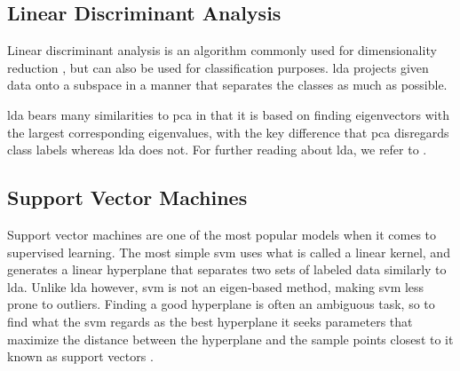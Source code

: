 


\subsection{Linear Discriminant Analysis}

Linear discriminant analysis is an algorithm commonly used for dimensionality reduction \citep{raschka_2014}, but can also be used for classification purposes. \gls{lda} projects given data onto a subspace in a manner that separates the classes as much as possible. 

\gls{lda} bears many similarities to \gls{pca} in that it is based on finding eigenvectors with the largest corresponding eigenvalues, with the key difference that \gls{pca} disregards class labels whereas \gls{lda} does not. For further reading about \gls{lda}, we refer to \citep{raschka_2014}.



\subsection{Support Vector Machines}
Support vector machines are one of the most popular models when it comes to supervised learning. The most simple \gls{svm} uses what is called a linear kernel, and generates a linear hyperplane that separates two sets of labeled data similarly to \gls{lda}. Unlike \gls{lda} however, \gls{svm} is not an eigen-based method, making \gls{svm} less prone to outliers. Finding a good hyperplane is often an ambiguous task, so to find what the \gls{svm} regards as the best hyperplane it seeks parameters that maximize the distance between the hyperplane and the sample points closest to it known as support vectors \citep{boswell_2002}. 


